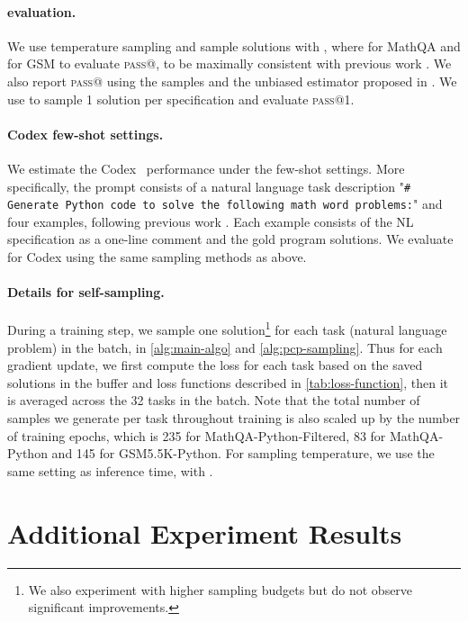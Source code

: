 \paragraph{\patk evaluation.}
We use temperature sampling and sample  solutions with , where  for MathQA and  for GSM to evaluate \textsc{pass}@, to be maximally consistent with previous work \citep{austin2021program, cobbe2021training, chowdhery2022palm}. We also report \textsc{pass}@ using the  samples and the unbiased estimator proposed in \cite{chen2021evaluating}. We use  to sample 1 solution per specification and evaluate \textsc{pass}@1. 

\paragraph{Codex few-shot settings.} 
We estimate the Codex~\citep{chen2021evaluating} performance under the few-shot settings. More specifically, the prompt consists of a natural language task description "\texttt{\# Generate Python code to solve the following math word problems:}" and four examples, following previous work \citep{chowdhery2022palm}. Each example consists of the NL specification as a one-line comment and the gold program solutions. We evaluate \patk for Codex using the same sampling methods as above.

\paragraph{Details for self-sampling.}  During a training step, we sample one solution\footnote{We also experiment with higher sampling budgets but do not observe significant improvements.} for each task (\ie natural language problem) in the batch, \ie  in \autoref{alg:main-algo} and \autoref{alg:pcp-sampling}. 
Thus for each gradient update, we first compute the loss for each task based on the saved solutions in the buffer and loss functions described in \autoref{tab:loss-function}, then it is averaged across the 32 tasks in the batch. 
Note that the total number of samples we generate per task throughout training is also scaled up by the number of training epochs, which is 235 for MathQA-Python-Filtered, 83 for MathQA-Python and 145 for GSM5.5K-Python. For sampling temperature, we use the same setting as inference time, with . 


\section{Additional Experiment Results}
\label{sec:additional-results}
